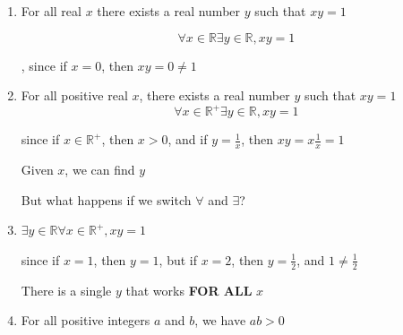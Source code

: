 \documentclass[../../Main.tex]{subfiles}
\begin{document}
\begin{example}
    
    \begin{enumerate}
        \item
            For all real $x$ there exists a real number $y$ such that $xy = 1$

            $$\forall x \in \mathbb{R} \exists y \in \mathbb{R}, xy = 1$$

            \begin{center}
                \FALSE, since if $x = 0$, then $xy = 0 \not = 1$
            \end{center}

        \item 
            For all positive real $x$, there exists a real number $y$ such that $xy = 1$
            $$\forall x \in \mathbb{R}^+ \exists y \in \mathbb{R}, xy = 1$$
            \begin{center}
                \TRUE since if $x \in \mathbb{R}^+$, then $x > 0$, and if $y = \frac{1}{x}$, then $xy = x \frac{1}{x} = 1$
            \end{center}

            \begin{note}
                Given $x$, we can find $y$

            \end{note}

        But what happens if we switch $\forall$ and $\exists$?

        \item
            $\exists y \in \mathbb{R} \forall x \in \mathbb{R}^+, xy = 1$

            \begin{center}
                \FALSE since if $x = 1$, then $y = 1$, but if $x = 2$, then $y = \frac{1}{2}$, and $1 \not = \frac{1}{2}$
            \end{center}

            \begin{note}
                There is a single $y$ that works \textbf{FOR ALL} $x$

            \end{note}

        \item
            For all  positive integers $a$ and $b$, we have $ab > 0$


\end{enumerate}
\end{example}
\end{document}
